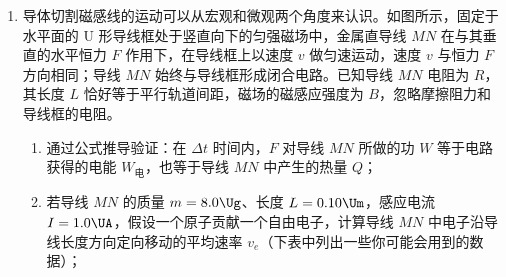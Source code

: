\documentclass[\gkver]{gaokaozhenti}
\begin{document}
\begin{enumerate}
\begin{enumerate}
	a．若在北极上空高出地面 $h$ 处称量，弹簧秤读数为 $F_{1}$，求比值 $F_{1}/F_{0}$ 的表达式，并就 $h=1.0\%R$ 的情形算出具体数值（计算结果保留两位有效数字）；

	b．若在赤道地面称量，弹簧秤读数为 $F_{2}$，求比值 $F_{2}/F_{0}$ 的表达式。
	\item
	设想地球绕太阳公转的圆周轨道半径 $r$、太阳的半径 $R_{s}$ 和地球的半径 $R$ 三者均减小为现在的 1.0\%，而太阳和地球的密度均匀且不变。仅考虑太阳和地球之间的相互作用，以现实地球的 1 年为标准，计算“设想地球”的 1 年将变为多长？
\end{enumerate}

\item
导体切割磁感线的运动可以从宏观和微观两个角度来认识。如图所示，固定于水平面的 U 形导线框处于竖直向下的匀强磁场中，金属直导线 $MN$ 在与其垂直的水平恒力 $F$ 作用下，在导线框上以速度 $v$ 做匀速运动，速度 $v$ 与恒力 $F$ 方向相同；导线 $MN$ 始终与导线框形成闭合电路。已知导线 $MN$ 电阻为 $R$，其长度 $L$ 恰好等于平行轨道间距，磁场的磁感应强度为 $B$，忽略摩擦阻力和导线框的电阻。
\begin{enumerate}
	\item
	通过公式推导验证：在 $\Delta t$ 时间内，$F$ 对导线 $MN$ 所做的功 $W$ 等于电路获得的电能 $W_{\text{电}}$，也等于导线 $MN$ 中产生的热量 $Q$；
	\item
	若导线 $MN$ 的质量 $m=8.0\Ug$、长度 $L=0.10\Um$，感应电流 $I=1.0\UA$，假设一个原子贡献一个自由电子，计算导线 $MN$ 中电子沿导线长度方向定向移动的平均速率 $v_{e}$（下表中列出一些你可能会用到的数据）；


\end{enumerate}
\end{enumerate}
\end{document}
